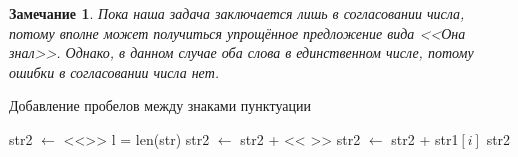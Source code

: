 \documentclass[a4paper,12pt]{article} %
\theoremstyle{definition}
\theoremstyle{plain}
\newtheorem{R}{Замечание}
\begin{document}
\begin{R}
	Пока наша задача заключается лишь в согласовании числа, потому вполне может получиться упрощённое предложение вида <<Она знал>>. Однако, в данном случае оба слова в единственном числе, потому ошибки в согласовании числа нет.
\end{R}


\begin{algorithm}
\caption{Добавление пробелов между знаками пунктуации}
\begin{algorithmic}[1]
\State str2 $\gets $ <<>> 
\State l = len(str)
\State str2 $\gets$ str2 + << >>
\EndIf
\State str2 $\gets$ str2 + str1$[i]$
\EndFor
\State\Return str2
\EndFunction
\end{algorithmic}
\end{algorithm}
\begin{comment}


\begin{algorithm}
	\caption{Обработка запятых}
	\begin{algorithmic}[1]
		\Function{comma}{строка $l$}
		\State l $\gets$ l.split() \Comment{получаем список из строки, разбивая по пробелам}
		\If{'и' присутствует в списке l}
		\State id = l.index('и') \Comment{индекс вхождения первой буквы 'и' в список}
		\State part = '
		\EndIf
		\EndFunction
	\end{algorithmic}
\end{algorithm}
\end{comment}
\end{document}
